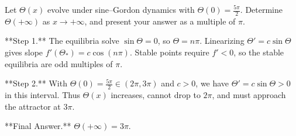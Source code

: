 Let $\Theta(x)$ evolve under sine–Gordon dynamics with $\Theta(0)=\tfrac{5\pi}{2}$. Determine $\Theta(+\infty)$ as $x\to+\infty$, and present your answer as a multiple of $\pi$.

**Step 1.** The equilibria solve $\sin \Theta = 0$, so $\Theta = n\pi$. Linearizing $\Theta' = c \sin \Theta$ gives slope $f'(\Theta_*) = c \cos(n\pi)$. Stable points require $f' < 0$, so the stable equilibria are odd multiples of $\pi$.

**Step 2.** With $\Theta(0) = \frac{5\pi}{2} \in (2\pi, 3\pi)$ and $c > 0$, we have $\Theta' = c \sin \Theta > 0$ in this interval. Thus $\Theta(x)$ increases, cannot drop to $2\pi$, and must approach the attractor at $3\pi$.

**Final Answer.** $\Theta(+\infty) = 3\pi$.
